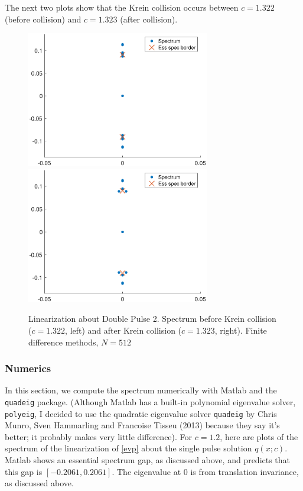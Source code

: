 \documentclass[12pt]{article}
\begin{document}
The next two plots show that the Krein collision occurs between $c = 1.322$ (before collision) and $c = 1.323$ (after collision).

\begin{figure}[H]
\centering
\includegraphics[width=8cm]{spec1322_double2.eps}
\includegraphics[width=8cm]{spec1323_double2.eps}
\caption{Linearization about Double Pulse 2. Spectrum before Krein collision ($c = 1.322$, left) and after Krein collision ($c = 1.323$, right). Finite difference methods, $N = 512$}
\end{figure}


\subsubsection{Numerics}

In this section, we compute the spectrum numerically with Matlab and the \texttt{quadeig} package. (Although Matlab has a built-in polynomial eigenvalue solver, \texttt{polyeig}, I decided to use the quadratic eigenvalue solver \texttt{quadeig} by Chris Munro, Sven Hammarling and Francoise Tisseu (2013) because they say it's better; it probably makes very little difference). For $c = 1.2$, here are plots of the spectrum of the linearization of \eqref{evp} about the single pulse solution $q(x; c)$. Matlab shows an essential spectrum gap, as discussed above, and predicts that this gap is $[-0.2061, 0.2061]$. The eigenvalue at 0 is from translation invariance, as discussed above.
\end{document}
